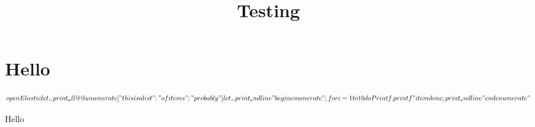 \documentclass{article}
\begin{document}
\title{Testing}

\maketitle

\section{Hello}

$${
open Elastic

let _ = print_all @@ enumerate
 [ "this is a list"
 ; "of items"
 ; "probably"
 ]

let _ =
  print_endline "\\begin{enumerate}" ;
  for i = 1 to 10 do
    Printf.printf "\\item %
  done ;
  print_endline "\\end{enumerate}"
}$$

Hello
\end{document}

